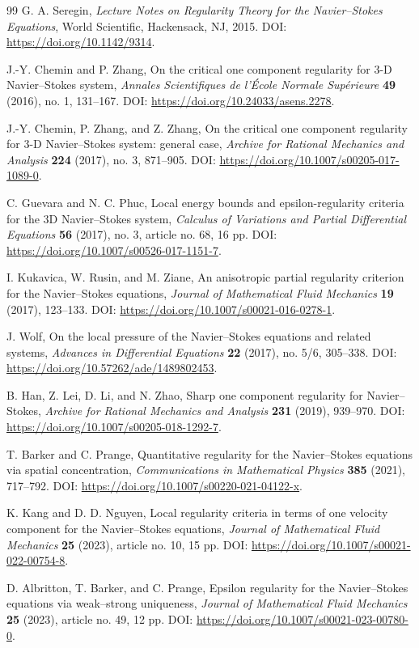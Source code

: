 \documentclass[pdflatex,sn-mathphys-num]{sn-jnl}
\numberwithin{equation}{section}
\theoremstyle{thmstyleone}
\theoremstyle{thmstylethree}
\begin{document}
\begin{thebibliography}{99}
	G. A. Seregin,
	\emph{Lecture Notes on Regularity Theory for the Navier--Stokes Equations},
	World Scientific, Hackensack, NJ, 2015.
	\newblock DOI: \url{https://doi.org/10.1142/9314}.
	
	J.-Y. Chemin and P. Zhang,
	On the critical one component regularity for 3-D Navier--Stokes system,
	\emph{Annales Scientifiques de l'\'Ecole Normale Sup\'erieure} \textbf{49} (2016), no. 1, 131--167.
	\newblock DOI: \url{https://doi.org/10.24033/asens.2278}.
	
	J.-Y. Chemin, P. Zhang, and Z. Zhang,
	On the critical one component regularity for 3-D Navier--Stokes system: general case,
	\emph{Archive for Rational Mechanics and Analysis} \textbf{224} (2017), no. 3, 871--905.
	\newblock DOI: \url{https://doi.org/10.1007/s00205-017-1089-0}.
	
	C. Guevara and N. C. Phuc,
	Local energy bounds and epsilon-regularity criteria for the 3D Navier--Stokes system,
	\emph{Calculus of Variations and Partial Differential Equations} \textbf{56} (2017), no. 3, article no. 68, 16 pp.
	\newblock DOI: \url{https://doi.org/10.1007/s00526-017-1151-7}.
	
	I. Kukavica, W. Rusin, and M. Ziane,
	An anisotropic partial regularity criterion for the Navier--Stokes equations,
	\emph{Journal of Mathematical Fluid Mechanics} \textbf{19} (2017), 123--133.
	\newblock DOI: \url{https://doi.org/10.1007/s00021-016-0278-1}.
	
	J. Wolf,
	On the local pressure of the Navier--Stokes equations and related systems,
	\emph{Advances in Differential Equations} \textbf{22} (2017), no. 5/6, 305--338.
	\newblock DOI: \url{https://doi.org/10.57262/ade/1489802453}.
	
	B. Han, Z. Lei, D. Li, and N. Zhao,
	Sharp one component regularity for Navier--Stokes,
	\emph{Archive for Rational Mechanics and Analysis} \textbf{231} (2019), 939--970.
	\newblock DOI: \url{https://doi.org/10.1007/s00205-018-1292-7}.
	
	T. Barker and C. Prange,
	Quantitative regularity for the Navier--Stokes equations via spatial concentration,
	\emph{Communications in Mathematical Physics} \textbf{385} (2021), 717--792.
	\newblock DOI: \url{https://doi.org/10.1007/s00220-021-04122-x}.
	
	K. Kang and D. D. Nguyen,
	Local regularity criteria in terms of one velocity component for the Navier--Stokes equations,
	\emph{Journal of Mathematical Fluid Mechanics} \textbf{25} (2023), article no. 10, 15 pp.
	\newblock DOI: \url{https://doi.org/10.1007/s00021-022-00754-8}.
	
	D. Albritton, T. Barker, and C. Prange,
	Epsilon regularity for the Navier--Stokes equations via weak--strong uniqueness,
	\emph{Journal of Mathematical Fluid Mechanics} \textbf{25} (2023), article no. 49, 12 pp.
	\newblock DOI: \url{https://doi.org/10.1007/s00021-023-00780-0}.
	
\end{thebibliography}
\end{document}
